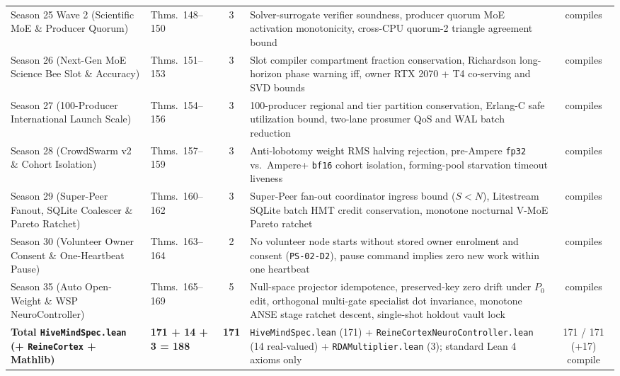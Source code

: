 \documentclass[11pt,a4paper]{article}
\begin{document}
\begin{table}[htbp!]
{\begin{tabular}{@{}llcp{6.7cm}c@{}}
Season 25 Wave 2 (Scientific MoE \& Producer Quorum) & Thms.\ 148--150 & 3 & Solver-surrogate verifier soundness, producer quorum MoE activation monotonicity, cross-CPU quorum-2 triangle agreement bound & compiles \\
Season 26 (Next-Gen MoE Science Bee Slot \& Accuracy) & Thms.\ 151--153 & 3 & Slot compiler compartment fraction conservation, Richardson long-horizon phase warning iff, owner RTX 2070 + T4 co-serving and SVD bounds & compiles \\
Season 27 (100-Producer International Launch Scale) & Thms.\ 154--156 & 3 & 100-producer regional and tier partition conservation, Erlang-C safe utilization bound, two-lane prosumer QoS and WAL batch reduction & compiles \\
Season 28 (CrowdSwarm v2 \& Cohort Isolation) & Thms.\ 157--159 & 3 & Anti-lobotomy weight RMS halving rejection, pre-Ampere \texttt{fp32} vs.\ Ampere+ \texttt{bf16} cohort isolation, forming-pool starvation timeout liveness & compiles \\
Season 29 (Super-Peer Fanout, SQLite Coalescer \& Pareto Ratchet) & Thms.\ 160--162 & 3 & Super-Peer fan-out coordinator ingress bound ($S < N$), Litestream SQLite batch HMT credit conservation, monotone nocturnal V-MoE Pareto ratchet & compiles \\
Season 30 (Volunteer Owner Consent \& One-Heartbeat Pause) & Thms.\ 163--164 & 2 & No volunteer node starts without stored owner enrolment and consent (\texttt{PS-02-D2}), pause command implies zero new work within one heartbeat & compiles \\
Season 35 (Auto Open-Weight \& WSP NeuroController) & Thms.\ 165--169 & 5 & Null-space projector idempotence, preserved-key zero drift under $P_0$ edit, orthogonal multi-gate specialist dot invariance, monotone ANSE stage ratchet descent, single-shot holdout vault lock & compiles \\
\midrule
\textbf{Total \texttt{HiveMindSpec.lean} (+ \texttt{ReineCortex} + Mathlib)} & \textbf{171 + 14 + 3 = 188} & \textbf{171} & \texttt{HiveMindSpec.lean} (171) + \texttt{ReineCortexNeuroController.lean} (14 real-valued) + \texttt{RDAMultiplier.lean} (3); standard Lean 4 axioms only & 171 / 171 (+17) compile \\
\bottomrule
\end{tabular}%
}
\end{table}

\end{document}
